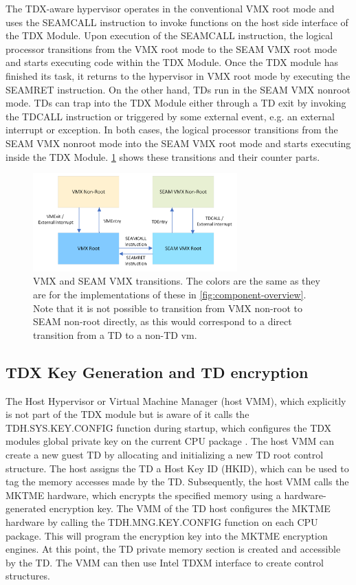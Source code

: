 The TDX-aware hypervisor operates in the conventional VMX root mode and uses the SEAMCALL instruction to invoke functions on the host side interface of the TDX Module. Upon execution of the SEAMCALL instruction, the logical processor transitions from the VMX root mode to the SEAM VMX root mode and starts executing code within the TDX Module. Once the TDX module has finished its task, it returns to the hypervisor in VMX root mode by executing the SEAMRET instruction. On the other hand, TDs run in the SEAM VMX nonroot mode. TDs can trap into the TDX Module either through a TD exit by invoking the TDCALL instruction or triggered by some external event, e.g. an external interrupt or exception. In both cases, the logical processor transitions from the SEAM VMX nonroot mode into the SEAM VMX root mode and starts executing inside the TDX Module. \cref{fig:seamFigure} shows these transitions and their counter parts.

\begin{figure}
\centering
\includegraphics[width=0.7\textwidth]{figures/SEAMVMXÜBergänge.png}
\caption{VMX and SEAM VMX transitions. The colors are the same as they are for the implementations of these in \cref{fig:component-overview}. Note that it is not possible to transition from VMX non-root to SEAM non-root directly, as this would correspond to a direct transition from a TD to a non-TD vm.}
\label{fig:seamFigure}
\end{figure}
\subsection{TDX Key Generation and TD encryption}
The Host Hypervisor or Virtual Machine Manager (host VMM), which explicitly is not part of the TDX module but is aware of it calls the TDH.SYS.KEY.CONFIG function during startup, which configures the TDX modules global private key on the current CPU package \cite{intel_corporation_intel-tdx-module-15-abi-spec-348551001pdf_2024}. The host VMM can create a new guest TD by allocating and initializing a new TD root control structure. The host assigns the TD a Host Key ID (HKID), which can be used to tag the memory accesses made by the TD\cite{noauthor_tdx-module-10-public-specpdf_nodate}. Subsequently, the host VMM calls the MKTME hardware, which encrypts the specified memory using a hardware-generated encryption key\cite{noauthor_multi-key-total-memory-encryption-spec-14pdf_nodate}. The VMM of the TD host configures the MKTME hardware by calling the TDH.MNG.KEY.CONFIG function on each CPU package. This will program the encryption key into the MKTME encryption engines\cite{noauthor_tdx-module-10-public-specpdf_nodate}. At this point, the TD private memory section is created and accessible by the TD. The VMM can then use Intel TDXM interface to create control structures. 

